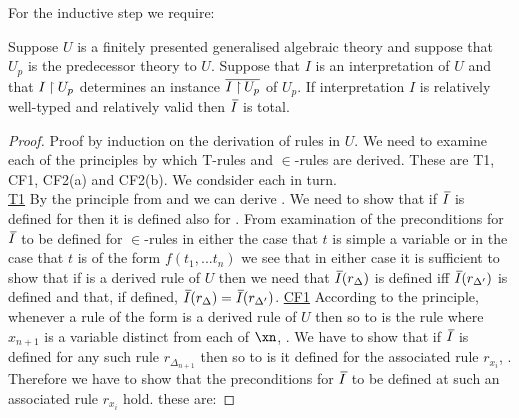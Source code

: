 For the inductive step we require:
\begin{lemma}
Suppose $U$ is a finitely presented generalised algebraic theory and 
suppose that $U_p$ is the predecessor theory to $U$. Suppose that $I$ is an interpretation of $U$  and that  $I \mathbin{\restriction} U_p$  
determines an instance $\overline{I \mathbin{\restriction} U_p}$ of $U_p$.
If interpretation $I$ is relatively well-typed and relatively valid then $\Ibar$ is total.
\end{lemma}
\begin{proof} 
\newcommand {\forceSOURCEwidth}{\rule{5cm}{0pt}}  %
\newcommand {\forceTARGETwidth}{\rule{2.2cm}{0pt}}
Proof by induction on the derivation of rules in $U$. We need to examine each of the principles by which T-rules and $\in$-rules
are derived. These are T1, CF1, CF2(a) and CF2(b). We condsider each in turn. \\
\underline{T1}
By the principle from  and  we can derive .
We need to show that if $\Ibar$ is defined for  then it is defined also for . 
From examination of the preconditions for $\Ibar$ to be defined for $\in$-rules in either the case that $t$ is simple a variable or in the case that
$t$ is of the form $f(t_1,...t_n)$ we see that in either case it is sufficient to show that if   is a derived rule of $U$
then we need that $\Ibar(r_\Delta)$ is defined iff $\Ibar(r_{\Delta'})$ is defined and that, if defined,  $\Ibar(r_\Delta) = \Ibar(r_{\Delta'})$.
\underline{CF1} According to the principle, whenever a rule of the form  is a derived rule of $U$ 
then so to is the rule  where $x_{n+1}$ is a variable distinct from each of $\xn$, \foreachi. 
We have to show that if $\Ibar$ is defined for any such rule $r_{\Delta_{n+1}}$ then so to is it defined for the associated rule $r_{x_i}$, \foreachi.
Therefore we have to show that the preconditions for $\Ibar$ to be defined at such an associated rule $r_{x_i}$ hold. these are:
\newcommand{\deltaimapped}{\crossx{a_{n+1}}{a_i}{a_{i-1}}}
\newcommand{\deltaimappedlong}{s(p_{a_{n+1},a_i})^*...s(p_{a_{n+1},a_1})^*(\crossx{a_{n+1}}{a_i}{1})}


\end{proof}
